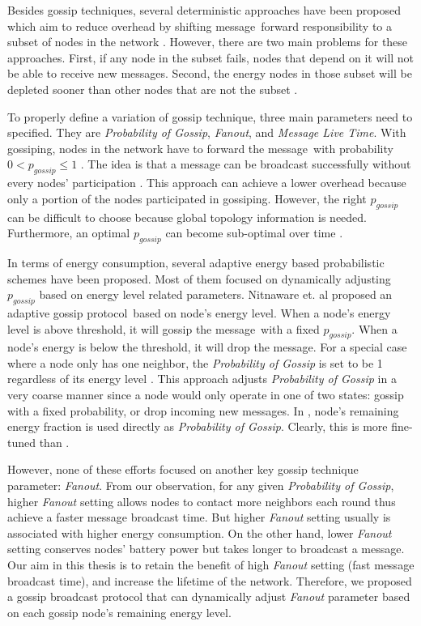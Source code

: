 \documentclass[onehalf,11pt]{beavtex}
\newcommand{\gp}{gossip protocol}
\newcommand{\pog}{Probability of Gossip}
\newcommand{\msgs}{messages}
\newcommand{\msg}{message}
\begin{document}
Besides gossip techniques, several deterministic approaches have been proposed which aim to reduce overhead by shifting \msg ~forward responsibility to a subset of nodes in the network \cite{smart}. However, there are two main problems for these approaches. First, if any node in the subset fails, nodes that depend on it will not be able to receive new \msgs \cite{smart}. Second, the energy nodes in those subset will be depleted sooner than other nodes that are not the subset \cite{smart}.

To properly define a variation of gossip technique, three main parameters need to specified. They are \emph{\pog}, \emph{Fanout}, and \emph{Message Live Time}. With gossiping, nodes in the network have to forward the \msg ~with probability $0 < p_{gossip} \leq 1$ \cite{smart}. The idea is that a message can be broadcast successfully without every nodes' participation \cite{smart}. This approach can achieve a lower overhead because only a portion of the nodes participated in gossiping. However, the right $p_{gossip}$ can be difficult to choose because global topology information is needed. Furthermore, an optimal $p_{gossip}$ can become sub-optimal over time \cite{smart}. 

In terms of energy consumption, several adaptive energy based probabilistic schemes have been proposed. Most of them focused on dynamically adjusting $p_{gossip}$ based on energy level related parameters. Nitnaware et. al \cite{nitnaware2009performance} proposed an adaptive \gp ~based on node's energy level. When a node's energy level is above threshold, it will gossip the \msg ~with a fixed $p_{gossip}$. When a node's energy is below the threshold, it will drop the \msg. For a special case where a node only has one neighbor, the \emph{\pog} is set to be 1 regardless of its energy level \cite{2015survey}. This approach adjusts \emph{\pog} in a very coarse manner since a node would only operate in one of two states: gossip with a fixed probability, or drop incoming new \msgs. In \cite{nitnaware2010energy}, node's remaining energy fraction is used directly as \emph{\pog}. Clearly, this is more fine-tuned than \cite{nitnaware2009performance}.

However, none of these efforts focused on another key gossip technique parameter: \emph{Fanout}. From our observation, for any given \emph{\pog}, higher \emph{Fanout} setting allows nodes to contact more neighbors each round thus achieve a faster message broadcast time. But higher \emph{Fanout} setting usually is associated with higher energy consumption. On the other hand, lower \emph{Fanout} setting conserves nodes' battery power but takes longer to broadcast a \msg. Our aim in this thesis is to retain the benefit of high \emph{Fanout} setting (fast message broadcast time), and increase the lifetime of the network. Therefore, we proposed a gossip broadcast protocol that can dynamically adjust \emph{Fanout} parameter based on each gossip node's remaining energy level.
\end{document}
